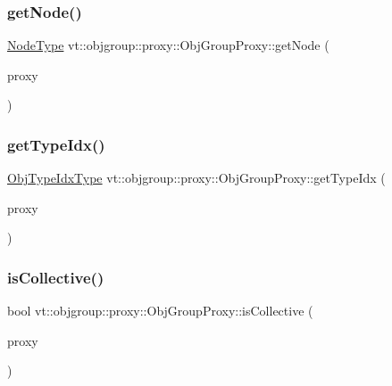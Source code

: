 \subsubsection{\texorpdfstring{get\+Node()}{getNode()}}
{\footnotesize\ttfamily \hyperlink{namespacevt_a866da9d0efc19c0a1ce79e9e492f47e2}{Node\+Type} vt\+::objgroup\+::proxy\+::\+Obj\+Group\+Proxy\+::get\+Node (\begin{DoxyParamCaption}\item[{\hyperlink{namespacevt_ad7cae989df485fccca57f0792a880a8e}{Obj\+Group\+Proxy\+Type}}]{proxy }\end{DoxyParamCaption})\hspace{0.3cm}{\ttfamily [static]}}

\mbox{\label{structvt_1_1objgroup_1_1proxy_1_1_obj_group_proxy_ad7cb9ad1cade184ec9a4320e04547dc1}} 
\subsubsection{\texorpdfstring{get\+Type\+Idx()}{getTypeIdx()}}
{\footnotesize\ttfamily \hyperlink{namespacevt_1_1objgroup_a378e4b966221779c74f3a2f921eb2421}{Obj\+Type\+Idx\+Type} vt\+::objgroup\+::proxy\+::\+Obj\+Group\+Proxy\+::get\+Type\+Idx (\begin{DoxyParamCaption}\item[{\hyperlink{namespacevt_ad7cae989df485fccca57f0792a880a8e}{Obj\+Group\+Proxy\+Type}}]{proxy }\end{DoxyParamCaption})\hspace{0.3cm}{\ttfamily [static]}}

\mbox{\label{structvt_1_1objgroup_1_1proxy_1_1_obj_group_proxy_a457aec12597def45b485d3dc12023a32}} 
\subsubsection{\texorpdfstring{is\+Collective()}{isCollective()}}
{\footnotesize\ttfamily bool vt\+::objgroup\+::proxy\+::\+Obj\+Group\+Proxy\+::is\+Collective (\begin{DoxyParamCaption}\item[{\hyperlink{namespacevt_ad7cae989df485fccca57f0792a880a8e}{Obj\+Group\+Proxy\+Type}}]{proxy }\end{DoxyParamCaption})\hspace{0.3cm}{\ttfamily [static]}}

